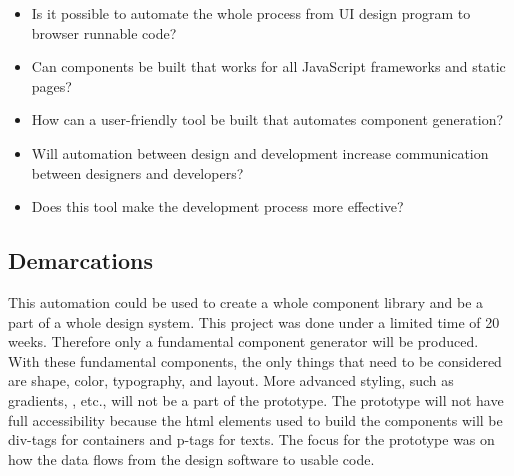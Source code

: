 \begin{itemize}
  \item Is it possible to automate the whole process from UI design program to browser runnable code? 
  \item Can \glspl{component} be built that works for all JavaScript frameworks and static pages? 
  \item How can a user-friendly tool be built that automates component generation? 
  \item Will automation between design and development increase communication between designers and developers? 
  \item Does this tool make the development process more effective?
\end{itemize}

\subsection{Demarcations}%
\label{sub:Demarcations}
This automation could be used to create a whole component library and be a part of a whole design system. This project was done under a limited time of 20 weeks. Therefore only a fundamental component generator will be produced. With these fundamental \glspl{component}, the only things that need to be considered are shape, color, typography, and layout. More advanced styling, such as gradients, , etc., will not be a part of the prototype. The prototype will not have full accessibility because the \acrshort{html} elements used to build the \glspl{component} will be \glspl{div-tag} for containers and \glspl{p-tag} for texts. The focus for the prototype was on how the data flows from the design software to usable code.




